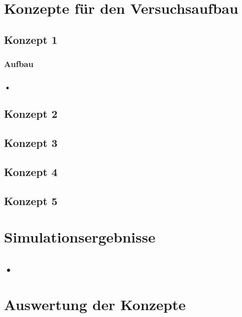 %

\chapter{Konzepte f\"{u}r den Versuchsaufbau}\label{ch:implementation}
\section{Konzept 1}
\subsection{Aufbau}
\subsection{•}
\section{Konzept 2}
\section{Konzept 3}
\section{Konzept 4}
\section{Konzept 5}
%

\chapter{Simulationsergebnisse}\label{ch:results}
\section{•}
%

\chapter{Auswertung der Konzepte}\label{ch:conclusion}
%

